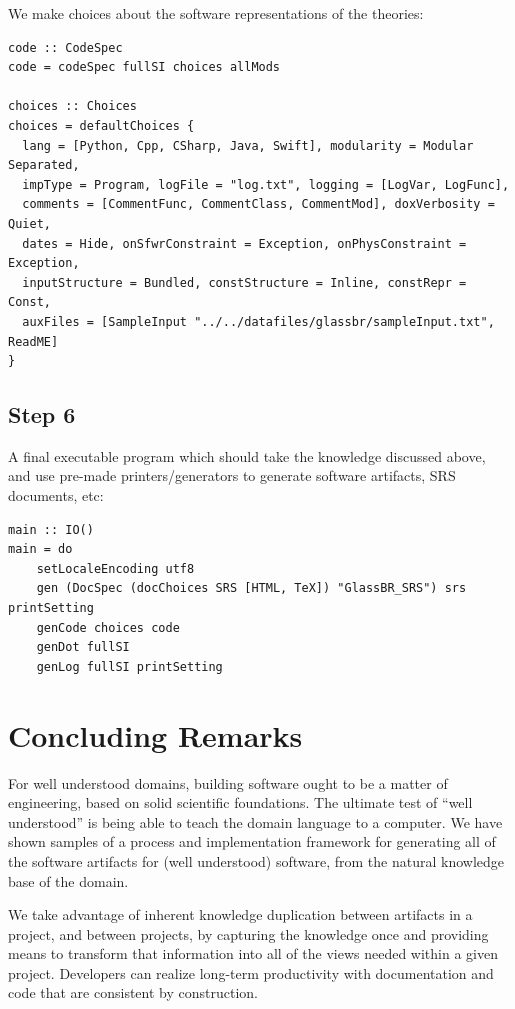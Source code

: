 \documentclass[sigconf,review,anonymous=false]{acmart}
\begin{document}
We make choices about the software representations of the theories:

\begin{lstlisting}
code :: CodeSpec
code = codeSpec fullSI choices allMods

choices :: Choices
choices = defaultChoices {
  lang = [Python, Cpp, CSharp, Java, Swift], modularity = Modular Separated,
  impType = Program, logFile = "log.txt", logging = [LogVar, LogFunc],
  comments = [CommentFunc, CommentClass, CommentMod], doxVerbosity = Quiet,
  dates = Hide, onSfwrConstraint = Exception, onPhysConstraint = Exception,
  inputStructure = Bundled, constStructure = Inline, constRepr = Const,
  auxFiles = [SampleInput "../../datafiles/glassbr/sampleInput.txt", ReadME] 
}
\end{lstlisting}

\subsection*{Step 6}

A final executable program which should take the knowledge discussed above, and
use pre-made printers/generators to generate software artifacts, SRS documents,
etc:

\begin{lstlisting}
main :: IO()
main = do
    setLocaleEncoding utf8
    gen (DocSpec (docChoices SRS [HTML, TeX]) "GlassBR_SRS") srs printSetting
    genCode choices code
    genDot fullSI
    genLog fullSI printSetting
\end{lstlisting}

\section{Concluding Remarks} \label{ch:concluding_remarks}

For well understood domains, building software ought to be a matter of
engineering, based on solid scientific foundations. The ultimate test of ``well
understood'' is being able to teach the domain language to a computer. We have
shown samples of a process and implementation framework for generating all of
the software artifacts for (well understood) software, from the natural
knowledge base of the domain.

We take advantage of inherent knowledge duplication between artifacts in a
project, and between projects, by capturing the knowledge once and providing
means to transform that information into all of the views needed within a given
project.  Developers can realize long-term productivity with documentation and
code that are consistent by construction.
\end{document}
